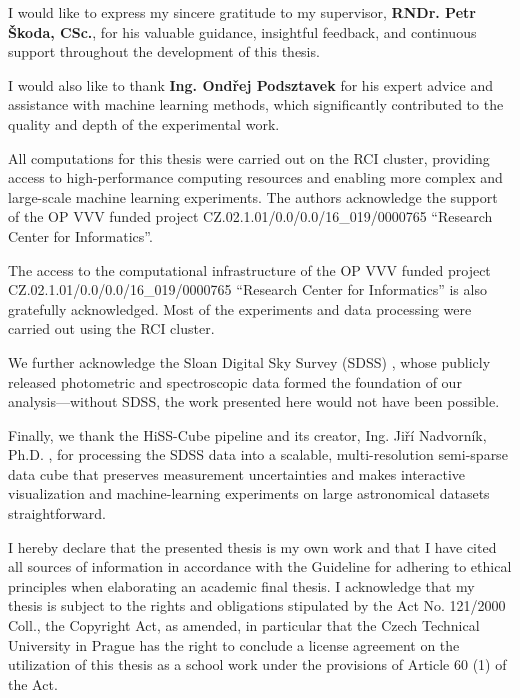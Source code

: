 \documentclass[english,bachelor,oneside]{ctufit-thesis}
\begin{document}
\frontmatter\frontmatterinit

\thispagestyle{empty}\maketitle\thispagestyle{empty}\cleardoublepage



\imprintpage
\stopTOCentries

\begin{acknowledgmentpage}
    I would like to express my sincere gratitude to my supervisor, \textbf{RNDr. Petr Škoda, CSc.}, for his valuable guidance, insightful feedback, and continuous support throughout the development of this thesis.

    I would also like to thank \textbf{Ing. Ondřej Podsztavek} for his expert advice and assistance with machine learning methods, which significantly contributed to the quality and depth of the experimental work.

    All computations for this thesis were carried out on the RCI cluster, providing access to high-performance computing resources and enabling more complex and large-scale machine learning experiments.
    The authors acknowledge the support of the OP VVV funded project 
    CZ.02.1.01/0.0/0.0/16\_019/0000765 ``Research Center for Informatics''.

    The access to the computational infrastructure of the OP VVV funded project 
    CZ.02.1.01/0.0/0.0/16\_019/0000765 ``Research Center for Informatics'' is also gratefully acknowledged. Most of the experiments and data processing were carried out using the RCI cluster.

    We further acknowledge the Sloan Digital Sky Survey (SDSS) \cite{SDSSData19:online}, whose publicly released photometric and spectroscopic data formed the foundation of our analysis—without SDSS, the work presented here would not have been possible.

    Finally, we thank the HiSS-Cube pipeline and its creator, Ing. Jiří Nadvorník, Ph.D. \cite{nadvornik2021hiss}, for processing the SDSS data into a scalable, multi-resolution semi-sparse data cube that preserves measurement uncertainties and makes interactive visualization and machine-learning experiments on large astronomical datasets straightforward.
    
\end{acknowledgmentpage}

\begin{declarationpage}
I hereby declare that the presented thesis is my own work and that I have cited all
sources of information in accordance with the Guideline for adhering to ethical
principles when elaborating an academic final thesis.
I acknowledge that my thesis is subject to the rights and obligations stipulated by the
Act No. 121/2000 Coll., the Copyright Act, as amended, in particular that the Czech
Technical University in Prague has the right to conclude a license agreement on the
utilization of this thesis as a school work under the provisions of Article 60 (1) of the
Act.
\end{declarationpage}
\end{document}
